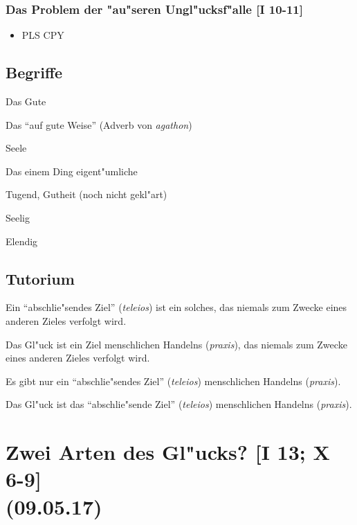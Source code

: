 \documentclass[emulatestandardclasses]{scrartcl}
\begin{document}
\subsubsection{Das Problem der "au"seren Ungl"ucksf"alle [I 10-11]}

\begin{itemize}
  \item PLS CPY
\end{itemize}

\subsection{Begriffe}

\begin{description}[leftmargin=!,labelwidth=\widthof{\bfseries \emph{makarios}}]
  \item[\emph{agathon}] Das Gute
  \item[\emph{eu}] Das "`auf gute Weise"' (Adverb von \emph{agathon})
  \item[\emph{psych\={e}}] Seele
  \item[\emph{idios}] Das einem Ding eigent"umliche
  \item[\emph{aret\={e}}] Tugend, Gutheit (noch nicht gekl"art)
  \item[\emph{makarios}] Seelig
  \item[\emph{athlios}] Elendig
\end{description}


\subsection{Tutorium}

\begin{description}[leftmargin=!,labelwidth=\widthof{\bfseries P3}]
  \item[P1] Ein "`abschlie"sendes Ziel"' (\emph{teleios}) ist ein solches, das niemals zum Zwecke eines anderen Zieles verfolgt wird.
  \item[P2] Das Gl"uck ist ein Ziel menschlichen Handelns (\emph{praxis}), das niemals zum Zwecke eines anderen Zieles verfolgt wird.
  \item[P3] Es gibt nur ein "`abschlie"sendes Ziel"' (\emph{teleios}) menschlichen Handelns (\emph{praxis}).
  \item[K] Das Gl"uck ist das "`abschlie"sende Ziel"' (\emph{teleios}) menschlichen Handelns (\emph{praxis}).
\end{description}


\section{Zwei Arten des Gl"ucks? [I 13; X 6-9]\\(09.05.17)}
\end{document}
